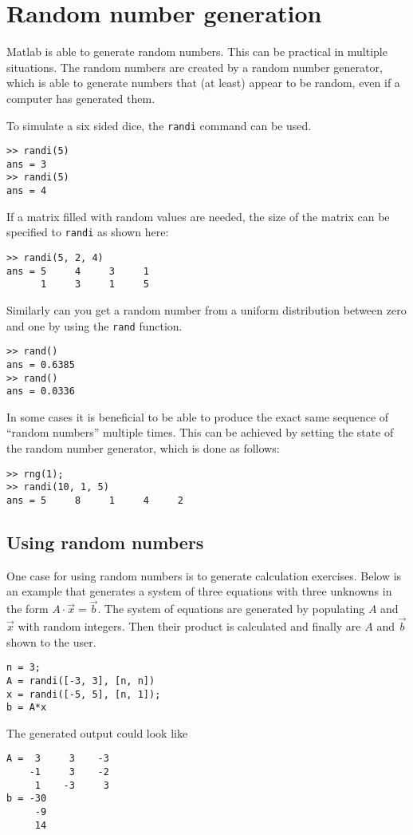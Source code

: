 \section{Random number generation}

Matlab is able to generate random numbers.
This can be practical in multiple situations.
The random numbers are created by a random number 
generator, which is able to generate numbers that 
(at least) appear to be random, even if a computer 
has generated them.

To simulate a six sided dice, the \verb!randi! command
can be used.
\begin{lstlisting}
>> randi(5)
ans = 3
>> randi(5)
ans = 4
\end{lstlisting}
If a matrix filled with random values are needed, the size
of the matrix can be specified to \verb!randi! as shown here:
\begin{lstlisting}
>> randi(5, 2, 4)
ans = 5     4     3     1
      1     3     1     5
\end{lstlisting}

Similarly can you get a random number from a uniform 
distribution between zero and one by using the \verb!rand! 
function.
\begin{lstlisting}
>> rand()
ans = 0.6385
>> rand()
ans = 0.0336
\end{lstlisting}
In some cases it is beneficial to be able to produce the exact
same sequence of ``random numbers'' multiple times.
This can be achieved by setting the state of the random number 
generator, which is done as follows:
\begin{lstlisting}
>> rng(1); 
>> randi(10, 1, 5)
ans = 5     8     1     4     2
\end{lstlisting}

\subsection{Using random numbers}

One case for using random numbers is to generate 
calculation exercises. 
Below is an example that generates a system of three
equations with three unknowns in the form 
$A \cdot \vec{x} = \vec{b}$.
The system of equations are generated by populating 
$A$ and $\vec{x}$ with random integers.
Then their product is calculated and finally are
$A$ and $\vec{b}$ shown to the user.
\begin{lstlisting}
n = 3;
A = randi([-3, 3], [n, n])
x = randi([-5, 5], [n, 1]);
b = A*x
\end{lstlisting}
The generated output could look like
\begin{lstlisting}
A =  3     3    -3
    -1     3    -2
     1    -3     3
b = -30
     -9
     14
\end{lstlisting}
 
